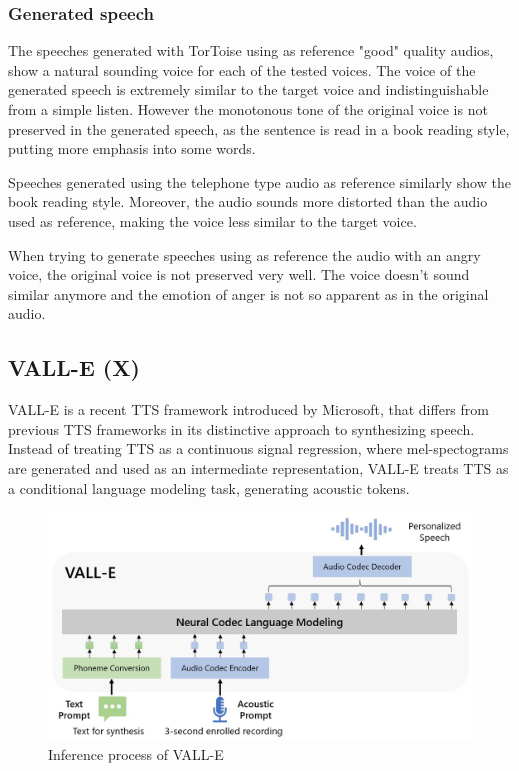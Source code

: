 \subsubsection{Generated speech}

The speeches generated with TorToise using as reference "good" quality audios, show a natural sounding voice for each of the tested voices. The voice of the generated speech is extremely similar to the target voice and indistinguishable from a simple listen. However the monotonous tone of the original voice is not preserved in the generated speech, as the sentence is read in a book reading style, putting more emphasis into some words.

Speeches generated using the telephone type audio as reference similarly show the book reading style. Moreover, the audio sounds more distorted than the audio used as reference, making the voice less similar to the target voice.

When trying to generate speeches using as reference the audio with an angry voice, the original voice is not preserved very well. The voice doesn't sound similar anymore and the emotion of anger is not so apparent as in the original audio. 




\subsection{VALL-E (X)}
VALL-E \cite{wang2301neural} is a recent TTS framework introduced by Microsoft, that differs from previous TTS frameworks in its distinctive approach to synthesizing speech. Instead of treating TTS as a continuous signal regression, where mel-spectograms are generated and used as an intermediate representation, VALL-E treats TTS as a conditional language modeling task, generating acoustic tokens.

\begin{figure}[h!]
    \centering
    \includegraphics[width=1\linewidth]{assets/VALLE_Overview.jpg}
    \caption{Inference process of VALL-E \cite{wang2301neural}}
    \label{fig:valle_overview}
\end{figure}


